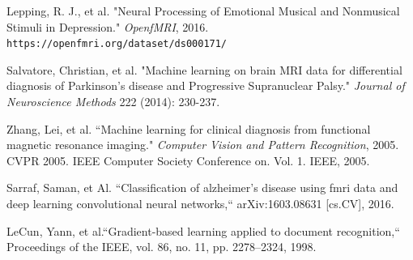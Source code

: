 \documentclass{article}[12pt]
\begin{document}
   \newpage
   \begin{thebibliography}{9}
   	
   	Lepping, R. J., et al. "Neural Processing of Emotional Musical and Nonmusical Stimuli in Depression." \textit{OpenfMRI}, 2016.\\
   	\texttt{https://openfmri.org/dataset/ds000171/}
   	
   	Salvatore, Christian, et al. "Machine learning on brain MRI data for differential diagnosis of Parkinson's disease and Progressive Supranuclear Palsy." \textit{Journal of Neuroscience Methods} 222 (2014): 230-237.
   	
   	Zhang, Lei, et al. ``Machine learning for clinical diagnosis from functional magnetic resonance imaging." \textit{Computer Vision and Pattern Recognition}, 2005. CVPR 2005. IEEE Computer Society Conference on. Vol. 1. IEEE, 2005.
   
   Sarraf, Saman, et Al. ``Classification  of alzheimer’s disease using fmri data and deep learning convolutional neural networks,`` arXiv:1603.08631 [cs.CV], 2016.
   	
   	LeCun, Yann, et al.``Gradient-based learning applied to document recognition,`` Proceedings of the IEEE, vol. 86, no. 11, pp. 2278–2324, 1998. 
   	\end{thebibliography}
   
   
   
   
   
\end{document}
